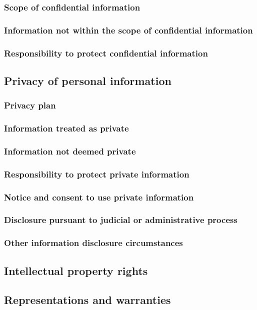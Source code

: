 \documentclass[10pt]{article}
\begin{document}
\subsubsection{Scope of confidential information}
\subsubsection{Information not within the scope of confidential information}
\subsubsection{Responsibility to protect confidential information}
\subsection{Privacy of personal information}
\subsubsection{Privacy plan}
\subsubsection{Information treated as private}
\subsubsection{Information not deemed private}
\subsubsection{Responsibility to protect private information}
\subsubsection{Notice and consent to use private information}
\subsubsection{Disclosure pursuant to judicial or administrative process}
\subsubsection{Other information disclosure circumstances}
\subsection{Intellectual property rights}
\subsection{Representations and warranties}
\end{document}
